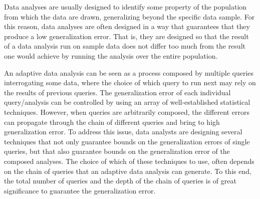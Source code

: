 
Data analyses are usually designed to identify some property of the population 
from which the data are drawn, generalizing beyond the specific data sample. 
For this reason, data analyses are often designed in a way that guarantees that they produce a low generalization error.
That is, they are designed so that the result of a data analysis run on sample data does not differ too much from the result one would achieve by running the analysis over the entire population. 

An adaptive data analysis can be seen as a process composed by multiple queries interrogating some data, where the choice of which query to run next may rely on the results of previous queries. 
The generalization error of each individual query/analysis can be controlled by using an array of well-established statistical techniques.
However, when queries are arbitrarily composed, the different errors can propagate through the chain of different queries and bring to high generalization error. 
To address this issue, data analysts are designing several techniques that not only guarantee bounds on the generalization errors of single queries, but that also guarantee bounds on the generalization error of the composed analyses. 
The choice of which of these techniques to use, often depends on the chain of queries that an adaptive data analysis can generate.
To this end, the total number of queries and the depth of the chain of queries is of great significance 
to guarantee the generalization error.


